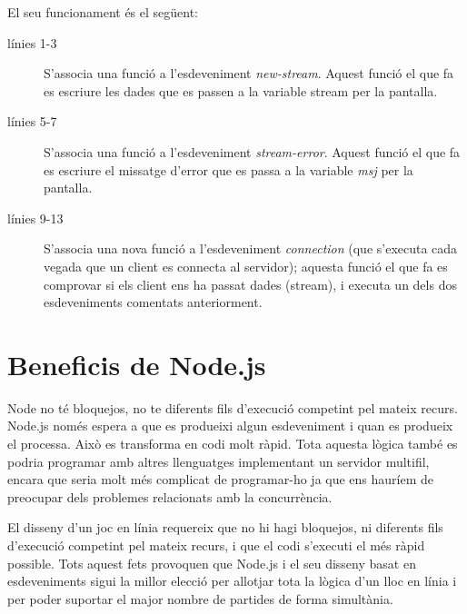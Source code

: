 El seu funcionament és el següent: 

\begin{description}
    \item[línies 1-3] {S'associa una funció a l'esdeveniment \emph{new-stream}. Aquest funció el que fa es escriure les dades que es passen a la variable stream per la pantalla.}
    \item[línies 5-7] {S'associa una funció a l'esdeveniment \emph{stream-error}. Aquest funció el que fa es escriure el missatge d'error que es passa a la variable \emph{msj} per la pantalla.}
  \item[línies 9-13] {S'associa una nova funció a l'esdeveniment \emph{connection} (que s'executa cada vegada que un client es connecta al servidor); aquesta funció el que fa es comprovar si els client ens ha passat dades (stream), i executa un dels dos esdeveniments comentats anteriorment.}
\end{description}

\section{Beneficis de Node.js}

Node no té bloquejos, no te diferents fils d'execució competint pel mateix recurs. Node.js només espera a que es produeixi algun esdeveniment i quan es produeix el processa. Això es transforma en codi molt ràpid. Tota aquesta lògica també es podria programar amb altres llenguatges implementant un servidor multifil, encara que seria molt més complicat de programar-ho ja que ens hauríem de preocupar dels problemes relacionats amb la concurrència. 

El disseny d'un joc en línia requereix que no hi hagi bloquejos, ni diferents fils d'execució competint pel mateix recurs, i que el codi s'executi el més ràpid possible. Tots aquest fets provoquen que Node.js i el seu disseny basat en esdeveniments sigui la millor elecció per allotjar tota la lògica d'un lloc en línia i per poder suportar el major nombre de partides de forma simultània.


